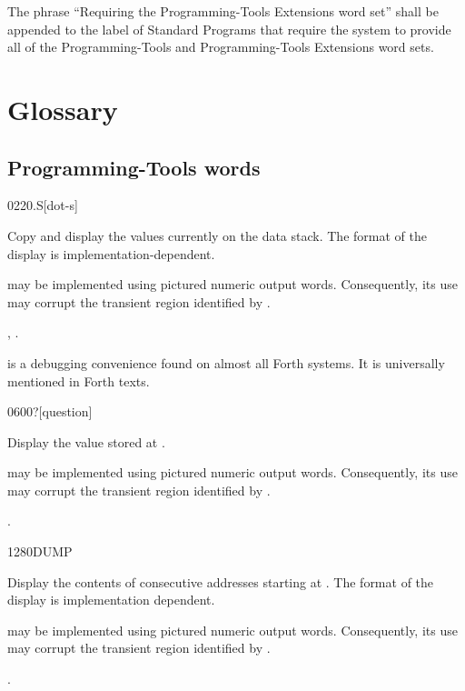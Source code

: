 The phrase ``Requiring the Programming-Tools Extensions word set''
shall be appended to the label of Standard Programs that require the
system to provide all of the Programming-Tools and Programming-Tools
Extensions word sets.



\section{Glossary} %

\subsection{Programming-Tools words} %

\begin{worddef}{0220}{.S}[dot-s]
\item \stack{}{}

	Copy and display the values currently on the data stack. The
	format of the display is implementation-dependent.

	 may be implemented using pictured numeric output words.
	Consequently, its use may corrupt the transient region identified
	by .

\see {},
	.

	\begin{rationale} %
		 is a debugging convenience found on almost
		all Forth systems. It is universally mentioned in Forth texts.
	\end{rationale}
\end{worddef}


\begin{worddef}[q]{0600}{?}[question]
\item {}

	Display the value stored at .

	 may be implemented using pictured numeric output words.
	Consequently, its use may corrupt the transient region identified
	by .

\see {}.
\end{worddef}


\begin{worddef}{1280}{DUMP}
\item {}

	Display the contents of  consecutive addresses starting
	at . The format of the display is implementation
	dependent.

	 may be implemented using pictured numeric output
	words. Consequently, its use may corrupt the transient region
	identified by .

\see {}.
\end{worddef}


